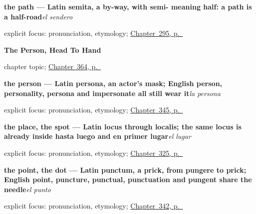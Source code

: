 \noindent\begin{minipage}[t]{\linewidth}
\raggedright
\textbf{the path — Latin semita, a by-way, with semi- meaning half: a path is a half-road}\enspace\emph{el sendero}\par
\footnotesize explicit focus: pronunciation, etymology; \hyperref[ch:el-sendero]{Chapter~295, p.~\pageref*{ch:el-sendero}}
\end{minipage}\par\smallskip

\noindent\begin{minipage}[t]{\linewidth}
\raggedright
\textbf{The Person, Head To Hand}\par
\footnotesize chapter topic; \hyperref[ch:la-mujer-y-la-cara]{Chapter~364, p.~\pageref*{ch:la-mujer-y-la-cara}}
\end{minipage}\par\smallskip

\noindent\begin{minipage}[t]{\linewidth}
\raggedright
\textbf{the person — Latin persona, an actor's mask; English person, personality, persona and impersonate all still wear it}\enspace\emph{la persona}\par
\footnotesize explicit focus: pronunciation, etymology; \hyperref[ch:cada-y-mismo]{Chapter~345, p.~\pageref*{ch:cada-y-mismo}}
\end{minipage}\par\smallskip

\noindent\begin{minipage}[t]{\linewidth}
\raggedright
\textbf{the place, the spot — Latin locus through localis; the same locus is already inside hasta luego and en primer lugar}\enspace\emph{el lugar}\par
\footnotesize explicit focus: pronunciation, etymology; \hyperref[ch:pais-y-lugar]{Chapter~325, p.~\pageref*{ch:pais-y-lugar}}
\end{minipage}\par\smallskip

\noindent\begin{minipage}[t]{\linewidth}
\raggedright
\textbf{the point, the dot — Latin punctum, a prick, from pungere to prick; English point, puncture, punctual, punctuation and pungent share the needle}\enspace\emph{el punto}\par
\footnotesize explicit focus: pronunciation, etymology; \hyperref[ch:el-minuto-y-el-cuarto]{Chapter~342, p.~\pageref*{ch:el-minuto-y-el-cuarto}}
\end{minipage}\par\smallskip

